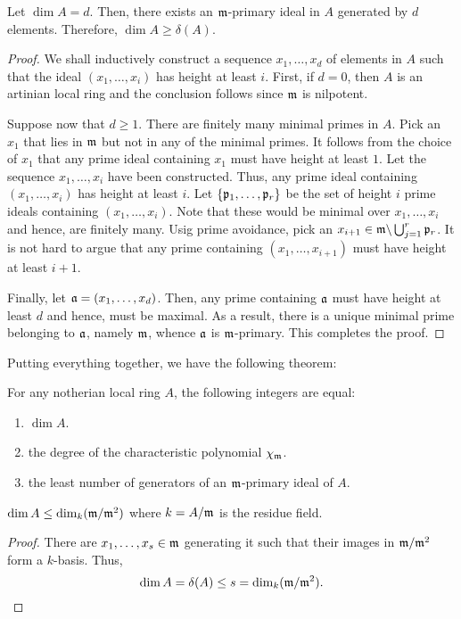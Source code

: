 \begin{proposition}
    Let $\dim A = d$. Then, there exists an $\mathfrak m$-primary ideal in $A$ generated by $d$ elements. Therefore, $\dim A\ge\delta(A)$.
\end{proposition}
\begin{proof}
    We shall inductively construct a sequence $x_1,\dots,x_d$ of elements in $A$ such that the ideal $(x_1,\dots,x_i)$ has height at least $i$. First, if $d = 0$, then $A$ is an artinian local ring and the conclusion follows since $\mathfrak m$ is nilpotent.

    Suppose now that $d\ge 1$. There are finitely many minimal primes in $A$. Pick an $x_1$ that lies in $\mathfrak m$ but not in any of the minimal primes. It follows from the choice of $x_1$ that any prime ideal containing $x_1$ must have height at least $1$. Let the sequence $x_1,\dots,x_i$ have been constructed. Thus, any prime ideal containing $(x_1,\dots,x_i)$ has height at least $i$. Let $\{\mathfrak p_1,\dots,\mathfrak p_r\}$ be the set of height $i$ prime ideals containing $(x_1,\dots,x_i)$. Note that these would be minimal over $x_1,\dots,x_i$ and hence, are finitely many. Usig prime avoidance, pick an $x_{i + 1}\in\mathfrak m\backslash\bigcup_{j = 1}^r\mathfrak p_r$. It is not hard to argue that any prime containing $(x_1,\dots,x_{i + 1})$ must have height at least $i + 1$.

    Finally, let $\mathfrak a = (x_1,\dots,x_d)$. Then, any prime containing $\mathfrak a$ must have height at least $d$ and hence, must be maximal. As a result, there is a unique minimal prime belonging to $\mathfrak a$, namely $\mathfrak m$, whence $\mathfrak a$ is $\mathfrak m$-primary. This completes the proof.
\end{proof}

Putting everything together, we have the following theorem:

\begin{theorem}
    For any notherian local ring $A$, the following integers are equal: 
    \begin{enumerate}[label=(\alph*)]
        \item $\dim A$. 
        \item the degree of the characteristic polynomial $\chi_\mathfrak m$.
        \item the least number of generators of an $\mathfrak m$-primary ideal of $A$.
    \end{enumerate}
\end{theorem}

\begin{corollary}
    $\dim A\le\dim_k(\mathfrak m/\mathfrak m^2)$ where $k = A/\mathfrak m$ is the residue field.
\end{corollary}
\begin{proof}
    There are $x_1,\dots,x_s\in\mathfrak m$ generating it such that their images in $\mathfrak m/\mathfrak m^2$ form a $k$-basis. Thus, 
    \begin{equation*}
        \dim A = \delta(A)\le s = \dim_k(\mathfrak m/\mathfrak m^2).\qedhere
    \end{equation*}
\end{proof}

